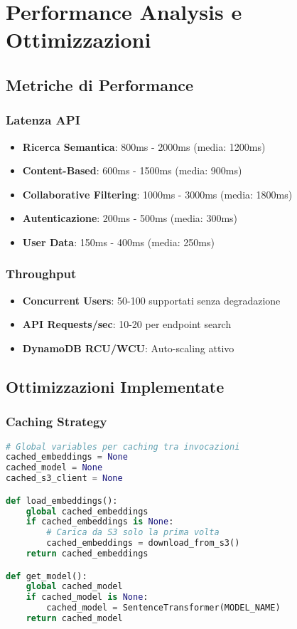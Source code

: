 \documentclass[11pt,a4paper]{article}
\begin{document}
\section{Performance Analysis e Ottimizzazioni}

\subsection{Metriche di Performance}

\subsubsection{Latenza API}
\begin{itemize}
  \item \textbf{Ricerca Semantica}: 800ms - 2000ms (media: 1200ms)
  \item \textbf{Content-Based}: 600ms - 1500ms (media: 900ms)
  \item \textbf{Collaborative Filtering}: 1000ms - 3000ms (media: 1800ms)
  \item \textbf{Autenticazione}: 200ms - 500ms (media: 300ms)
  \item \textbf{User Data}: 150ms - 400ms (media: 250ms)
\end{itemize}

\subsubsection{Throughput}
\begin{itemize}
  \item \textbf{Concurrent Users}: 50-100 supportati senza degradazione
  \item \textbf{API Requests/sec}: 10-20 per endpoint search
  \item \textbf{DynamoDB RCU/WCU}: Auto-scaling attivo
\end{itemize}

\subsection{Ottimizzazioni Implementate}

\subsubsection{Caching Strategy}
\begin{lstlisting}[language=Python, caption=Lambda Memory Caching]
# Global variables per caching tra invocazioni
cached_embeddings = None
cached_model = None
cached_s3_client = None

def load_embeddings():
    global cached_embeddings
    if cached_embeddings is None:
        # Carica da S3 solo la prima volta
        cached_embeddings = download_from_s3()
    return cached_embeddings

def get_model():
    global cached_model
    if cached_model is None:
        cached_model = SentenceTransformer(MODEL_NAME)
    return cached_model
\end{lstlisting}
\end{document}
